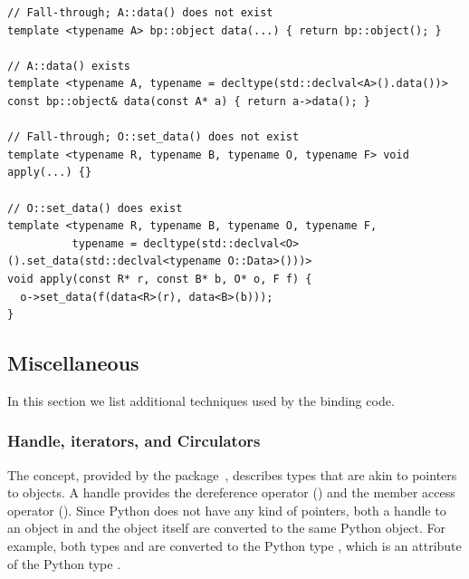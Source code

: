 \begin{lstfloat}
  \begin{lstlisting}[style=cppFramedStyle,basicstyle=\normalsize,
                     label={lst:data},
                     caption={Automatic generation of bindings for the overlay function traits exploiting SFINAE.}]
// Fall-through; A::data() does not exist
template <typename A> bp::object data(...) { return bp::object(); }

// A::data() exists
template <typename A, typename = decltype(std::declval<A>().data())>
const bp::object& data(const A* a) { return a->data(); }

// Fall-through; O::set_data() does not exist
template <typename R, typename B, typename O, typename F> void apply(...) {}

// O::set_data() does exist
template <typename R, typename B, typename O, typename F,
          typename = decltype(std::declval<O>().set_data(std::declval<typename O::Data>()))>
void apply(const R* r, const B* b, O* o, F f) {
  o->set_data(f(data<R>(r), data<B>(b)));
}
  \end{lstlisting}
\end{lstfloat}

\subsection{Miscellaneous}
\label{sec:code:misc}
In this section we list additional techniques used by the binding code.

\subsubsection{Handle, iterators, and Circulators}
\label{sec:code:misc:iters}
The  concept, provided by the
\HandlesandCirculatorsPackage{} package~\cite{cgal:dksy-hc-21a},
describes types that are akin to pointers to objects. A handle
provides the dereference operator () and the
member access operator (\cppLstinline{->()}). Since Python does not
have any kind of pointers, both a handle to an object in \cgal{} and
the object itself are converted to the same Python object. For
example, both types  and
 are converted to the
Python type , which is an attribute of the Python
type .

